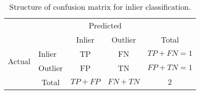 \begin{table}[H]
	\centering
	\begin{tabular}{l|l|c|c|c}
		\multicolumn{2}{c}{}&\multicolumn{2}{c}{Predicted}&\\
		\cline{3-4}
		\multicolumn{2}{c|}{}&Inlier&Outlier&\multicolumn{1}{c}{Total}\\
		\cline{2-4}
		\multirow{2}{*}{Actual}& Inlier & TP & FN & $TP+FN=1$\\
		\cline{2-4}
		& Outlier & FP & TN & $FP+TN=1$\\
		\cline{2-4}
		\multicolumn{1}{c}{} & \multicolumn{1}{c}{Total} & \multicolumn{1}{c}{$TP+FP$} & \multicolumn{    1}{c}{$FN+TN$} & \multicolumn{1}{c}{$2$}\\
	\end{tabular}
	\caption{Structure of confusion matrix for inlier classification.}
	\label{table:confusion}
\end{table}
